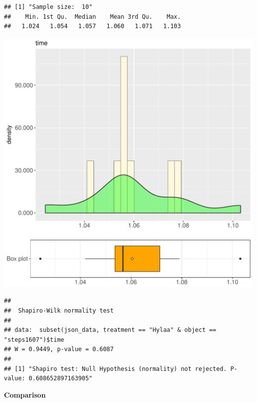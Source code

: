 \documentclass{article}\usepackage[]{graphicx}\usepackage[]{color}
\makeatletter
\def\maxwidth{ %
  \ifdim\Gin@nat@width>\linewidth
    \linewidth
  \else
    \Gin@nat@width
  \fi
}
\newenvironment{kframe}{%
 \def\at@end@of@kframe{}%
 \ifinner\ifhmode%
  \def\at@end@of@kframe{\end{minipage}}%
  \begin{minipage}{\columnwidth}%
 \fi\fi%
 \def\FrameCommand##1{\hskip\@totalleftmargin \hskip-\fboxsep
 \colorbox{shadecolor}{##1}\hskip-\fboxsep
     \hskip-\linewidth \hskip-\@totalleftmargin \hskip\columnwidth}%
 \MakeFramed {\advance\hsize-\width
   \@totalleftmargin\z@ \linewidth\hsize
   \@setminipage}}%
 {\par\unskip\endMakeFramed%
 \at@end@of@kframe}
\newenvironment{knitrout}{}{} %
\makeatother
\begin{document}
\begin{knitrout}
\color{fgcolor}\begin{kframe}
\begin{verbatim}
## [1] "Sample size:  10"
##    Min. 1st Qu.  Median    Mean 3rd Qu.    Max. 
##   1.024   1.054   1.057   1.060   1.071   1.103
\end{verbatim}
\end{kframe}
\includegraphics[width=\maxwidth]{figure/RH2_Hylaa_steps1607-1} 
\begin{kframe}\begin{verbatim}
## 
## 	Shapiro-Wilk normality test
## 
## data:  subset(json_data, treatment == "Hylaa" & object == "steps1607")$time
## W = 0.9449, p-value = 0.6087
## 
## [1] "Shapiro test: Null Hypothesis (normality) not rejected. P-value: 0.608652897163905"
\end{verbatim}
\end{kframe}
\end{knitrout}
  
 \textbf{Comparison}
  
\end{document}
